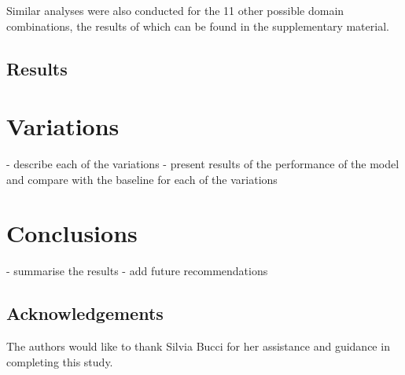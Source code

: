 \documentclass[10pt,twocolumn,letterpaper]{article}
\begin{document}
Similar analyses were also conducted for the 11 other possible domain combinations, the results of which can be found in the supplementary material.


\subsection{Results}



\section{Variations}
\label{sec:variations}

- describe each of the variations
- present results of the performance of the model and compare with the baseline for each of the variations

\section{Conclusions}
\label{sec:conclusion}

- summarise the results
- add future recommendations

\subsection{Acknowledgements}
The authors would like to thank Silvia Bucci for her assistance and guidance in completing this study.


{\small


}
\end{document}
